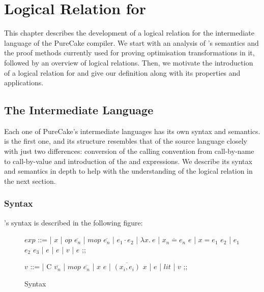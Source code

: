 \chapter{Logical Relation for \ThunkLang{}}
\label{chap:logrel}

This chapter describes the development of a logical relation for the
\ThunkLang{} intermediate language of the PureCake compiler. We start with an
analysis of \ThunkLang{}'s semantics and the proof methods currently used for
proving optimisation transformations in it, followed by an overview of logical
relations. Then, we motivate the introduction of a logical relation for
\ThunkLang{} and give our definition along with its properties and applications.

\section{The \ThunkLang{} Intermediate Language}

Each one of PureCake's intermediate languages has its own syntax and semantics.
\ThunkLang{} is the first one, and its structure resembles that of the source
language closely with just two differences: conversion of the calling convention
from call-by-name to call-by-value and introduction of the  and
 expressions. We describe its syntax and semantics in depth to help
with the understanding of the logical relation in the next section.

\subsection{Syntax}

\ThunkLang{}'s syntax is described in the following figure:

\begin{figure}[h]
  \begin{bnf}
    $exp$ ::=
    |  $x$
    |  $op$ $\overline{e_n}$
    |  $mop$ $\overline{e_n}$
    | $e_1 \cdot e_2$
    | $\lambda x.\ e$
    |  $\overline{x_n = e_n}$  $e$
    |  $x = e_1$  $e_2$
    |  $e_1$  $e_2$  $e_3$
    |  $e$
    |  $e$
    |  $v$
    |  $e$
    ;;
  \end{bnf}
  \begin{bnf}
    $v$ ::=
    |  C $\overline{v_n}$
    |  $mop$ $\overline{e_n}$
    |  $x$ $e$
    |  $\overline{(x_i, e_i)}$ $x$
    |  $e$
    |  $lit$
    |  $v$
    ;;
  \end{bnf}
  \caption{\ThunkLang{} Syntax}
\end{figure}

